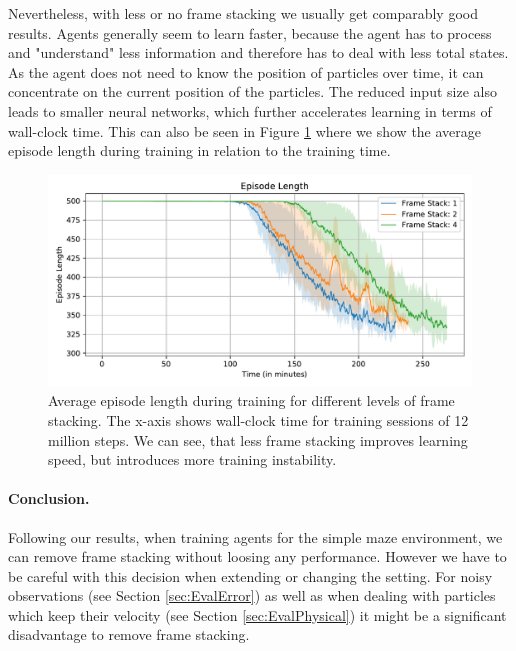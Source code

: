 Nevertheless, with less or no frame stacking we usually get comparably good results. Agents generally seem to learn faster, because the agent has to process and "understand" less information and therefore has to deal with less total states. As the agent does not need to know the position of particles over time, it can concentrate on the current position of the particles. The reduced input size also leads to smaller neural networks, which further accelerates learning in terms of wall-clock time. This can also be seen in Figure \ref{fig:Eval/FrameStacking/Maze0122} where we show the average episode length during training in relation to the training time. 

\begin{figure}[htp]
    \begin{center}
        \includegraphics[clip, width=0.8\columnwidth]{figures/evaluation/observations/maze0122_frame_stack_ep_len.pdf}
    \end{center}
    \caption[Average Training Episode Length for Different Levels of Frame Stacking]{Average episode length during training for different levels of frame stacking. The x-axis shows wall-clock time for training sessions of 12 million steps. We can see, that less frame stacking improves learning speed, but introduces more training instability.} \label{fig:Eval/FrameStacking/Maze0122}
\end{figure}

\paragraph{Conclusion. } Following our results, when training agents for the simple maze environment, we can remove frame stacking without loosing any performance. However we have to be careful with this decision when extending or changing the setting. For noisy observations (see Section \ref{sec:EvalError}) as well as when dealing with particles which keep their velocity (see Section \ref{sec:EvalPhysical}) it might be a significant disadvantage to remove frame stacking. 


